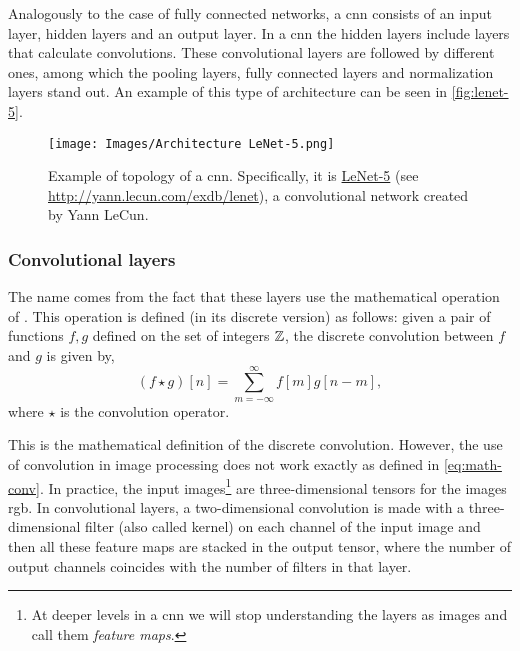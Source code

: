 Analogously to the case of fully connected networks, a \gls{cnn} consists of an
input layer, hidden layers and an output layer. In a \gls{cnn} the hidden
layers include layers that calculate convolutions. These convolutional layers
are followed by different ones, among which the pooling layers, fully connected
layers and normalization layers stand out. An example of this type of
architecture can be seen in \vref{fig:lenet-5}.

\begin{figure}[ht]
  \centering
  \texttt{[image: Images/Architecture LeNet-5.png]}
  \caption[Example of topology of a \acs*{cnn} (LeNet-5)]{Example of topology
    of a \gls{cnn}. Specifically, it is
    \href{http://yann.lecun.com/exdb/lenet}{LeNet-5} (see
    \url{http://yann.lecun.com/exdb/lenet}), a convolutional network created by
    Yann LeCun.}
  \label{fig:lenet-5}
\end{figure}

\subsubsection{Convolutional layers}

The name comes from the fact that these layers use the mathematical operation
of . This
operation is defined (in its discrete version) as follows: given a pair of
functions \(f, g\) defined on the set of integers \(\mathbb{Z}\), the discrete
convolution between \(f\) and \(g\) is given by,
\begin{equation} \label{eq:math-conv}
  (f \star g)[n] = \sum_{m=-\infty}^{\infty} f[m]g[n - m],
\end{equation}
where \(\star\) is the convolution operator.

This is the mathematical definition of the discrete convolution. However, the
use of convolution in image processing does not work exactly as defined in
\vref{eq:math-conv}. In practice, the input images\footnote{At deeper levels in
  a \gls{cnn} we will stop understanding the layers as images and call them
  \emph{feature maps}.} are three-dimensional tensors for the images
\acs{rgb}. In convolutional layers, a two-dimensional convolution is made with
a three-dimensional filter (also called kernel) on each channel of the input
image and then all these feature maps are stacked in the output tensor, where
the number of output channels coincides with the number of filters in that
layer.

